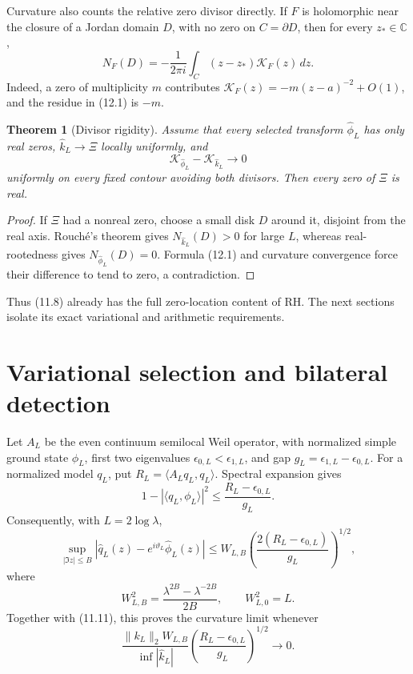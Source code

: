 \documentclass[11pt]{amsart}
\newtheorem{theorem}{Theorem}[section]
\theoremstyle{definition}
\theoremstyle{remark}
\newcommand{\C}{\mathbb C}
\newcommand{\XiR}{\Xi}
\begin{document}
Curvature also counts the relative zero divisor directly.  If \(F\) is
holomorphic near the closure of a Jordan domain \(D\), with no zero on
\(C=\partial D\), then for every \(z_*\in\C\),
\[
 \boxed{
 N_F(D)=-\frac1{2\pi i}\int_C(z-z_*)\mathcal K_F(z)\,dz.}
 \tag{12.1}
\]
Indeed, a zero of multiplicity \(m\) contributes
\(\mathcal K_F(z)=-m(z-a)^{-2}+O(1)\), and the residue in (12.1) is
\(-m\).

\begin{theorem}[Divisor rigidity]
\label{thm:divisor-rigidity}
Assume that every selected transform \(\widehat\phi_L\) has only real
zeros, \(\widehat k_L\to\XiR\) locally uniformly, and
\[
 \mathcal K_{\widehat\phi_L}-\mathcal K_{\widehat k_L}\longrightarrow0
\]
uniformly on every fixed contour avoiding both divisors.  Then every zero
of \(\XiR\) is real.
\end{theorem}

\begin{proof}
If \(\XiR\) had a nonreal zero, choose a small disk \(D\) around it,
disjoint from the real axis.  Rouch\'e's theorem gives
\(N_{\widehat k_L}(D)>0\) for large \(L\), whereas real-rootedness gives
\(N_{\widehat\phi_L}(D)=0\).  Formula (12.1) and curvature convergence
force their difference to tend to zero, a contradiction.
\end{proof}

Thus (11.8) already has the full zero-location content of RH.  The next
sections isolate its exact variational and arithmetic requirements.

\section{Variational selection and bilateral detection}
\label{sec:selection}

Let \(A_L\) be the even continuum semilocal Weil operator, with normalized
simple ground state \(\phi_L\), first two eigenvalues
\(\epsilon_{0,L}<\epsilon_{1,L}\), and gap
\(g_L=\epsilon_{1,L}-\epsilon_{0,L}\).  For a normalized model \(q_L\),
put \(R_L=\langle A_Lq_L,q_L\rangle\).  Spectral expansion gives
\[
 1-|\langle q_L,\phi_L\rangle|^2
 \le\frac{R_L-\epsilon_{0,L}}{g_L}.
 \tag{13.1}
\]
Consequently, with \(L=2\log\lambda\),
\[
 \sup_{|\Im z|\le B}
 |\widehat q_L(z)-e^{i\vartheta_L}\widehat\phi_L(z)|
 \le W_{L,B}
 \left(\frac{2(R_L-\epsilon_{0,L})}{g_L}\right)^{1/2},
 \tag{13.2}
\]
where
\[
 W_{L,B}^2=\frac{\lambda^{2B}-\lambda^{-2B}}{2B},
 \qquad W_{L,0}^2=L.
\]
Together with (11.11), this proves the curvature limit whenever
\[
 \boxed{
 \frac{\|k_L\|_2W_{L,B}}{\inf|\widehat k_L|}
 \left(\frac{R_L-\epsilon_{0,L}}{g_L}\right)^{1/2}
 \longrightarrow0.}
 \tag{13.3}
\]
\end{document}
